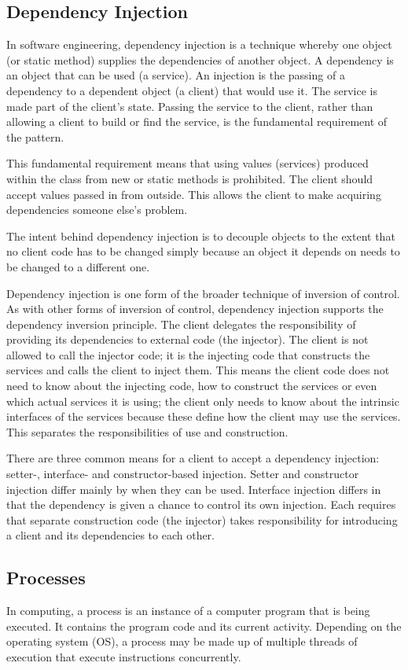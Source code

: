 \documentclass{article}
\begin{document}
		\subsection{Dependency Injection}
			In software engineering, dependency injection is a technique whereby one object (or static method) supplies the dependencies of another object. A dependency is an object that can be used (a service). An injection is the passing of a dependency to a dependent object (a client) that would use it. The service is made part of the client's state. Passing the service to the client, rather than allowing a client to build or find the service, is the fundamental requirement of the pattern.

			This fundamental requirement means that using values (services) produced within the class from new or static methods is prohibited. The client should accept values passed in from outside. This allows the client to make acquiring dependencies someone else's problem.

			The intent behind dependency injection is to decouple objects to the extent that no client code has to be changed simply because an object it depends on needs to be changed to a different one.

			Dependency injection is one form of the broader technique of inversion of control. As with other forms of inversion of control, dependency injection supports the dependency inversion principle. The client delegates the responsibility of providing its dependencies to external code (the injector). The client is not allowed to call the injector code; it is the injecting code that constructs the services and calls the client to inject them. This means the client code does not need to know about the injecting code, how to construct the services or even which actual services it is using; the client only needs to know about the intrinsic interfaces of the services because these define how the client may use the services. This separates the responsibilities of use and construction.

			There are three common means for a client to accept a dependency injection: setter-, interface- and constructor-based injection. Setter and constructor injection differ mainly by when they can be used. Interface injection differs in that the dependency is given a chance to control its own injection. Each requires that separate construction code (the injector) takes responsibility for introducing a client and its dependencies to each other.

		\subsection{Processes}
			In computing, a process is an instance of a computer program that is being executed. It contains the program code and its current activity. Depending on the operating system (OS), a process may be made up of multiple threads of execution that execute instructions concurrently.
\end{document}
